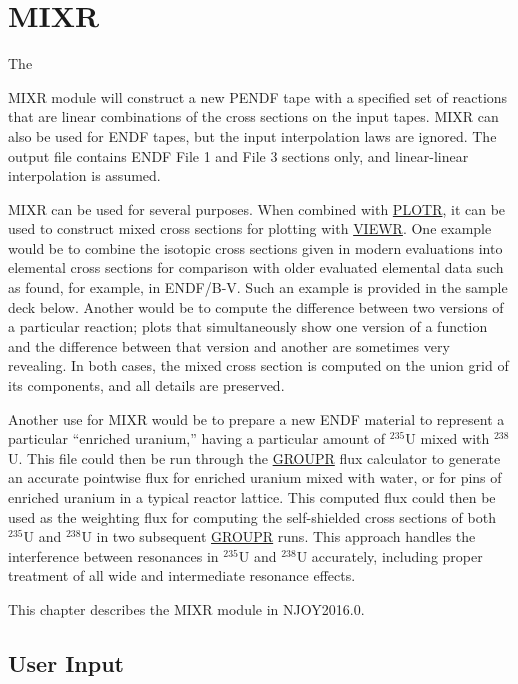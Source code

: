 \section{MIXR}
\label{sMIXR}

\hypertarget{sMIXRhy}{The}
MIXR module will construct a new PENDF tape with a specified set of
reactions that are linear combinations of the cross sections
on the input tapes.  MIXR can also be used for ENDF tapes, but the
input interpolation laws are ignored.  The output file contains
ENDF File 1 and File 3 sections only, and linear-linear interpolation
is assumed.

MIXR can be used for several purposes.  When combined with
\hyperlink{sPLOTRhy}{PLOTR},
it can be used to construct mixed cross sections for plotting with
\hyperlink{sVIEWRhy}{VIEWR}.  One example would be to combine
the isotopic cross sections
given in modern evaluations into elemental cross sections
 for comparison with older evaluated elemental
data such as found, for example, in ENDF/B-V.  Such an example is provided
in the sample deck below.  Another would be to compute the
difference between two versions of a particular reaction;
plots that simultaneously show one version of a function and
the difference between that version and another are sometimes very
revealing.  In both cases, the mixed cross section is computed on
the union grid of its components, and all details are preserved.

Another use for MIXR would be to prepare a new ENDF material to
represent a particular ``enriched uranium,'' having a particular
amount of $^{235}$U mixed with $^{238}$U.  This file could then
be run through the \hyperlink{sGROUPRhy}{GROUPR}
flux calculator to generate an accurate
pointwise flux for enriched uranium mixed with water, or for
pins of enriched uranium in a typical reactor lattice.  This
computed flux could then be used as the
weighting flux for
computing the self-shielded cross sections of both $^{235}$U and
$^{238}$U in two subsequent
\hyperlink{sGROUPRhy}{GROUPR} runs.  This approach handles
the interference between resonances in $^{235}$U and $^{238}$U
accurately, including proper treatment of all wide and
intermediate resonance effects.

This chapter describes the MIXR module in NJOY2016.0.

\subsection{User Input}
\label{ssMIXR_inp}

